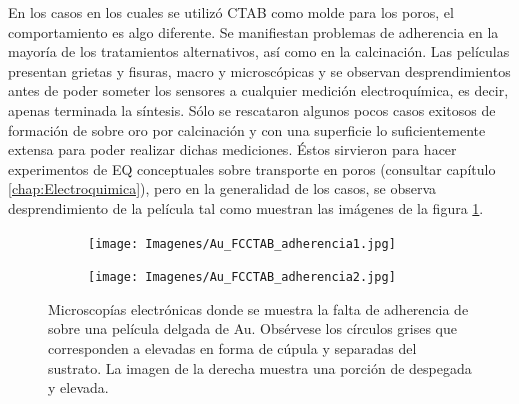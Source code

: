 			En los casos en los cuales se utilizó CTAB como molde para los poros, el comportamiento es algo diferente. Se manifiestan problemas de adherencia en la mayoría de los tratamientos alternativos, así como en la calcinación. Las películas presentan grietas y fisuras, macro y microscópicas y se observan desprendimientos antes de poder someter los sensores a cualquier medición electroquímica, es decir, apenas terminada la síntesis. Sólo se rescataron algunos pocos casos exitosos de formación de \pdmC\space sobre oro por calcinación y con una superficie lo suficientemente extensa para poder realizar dichas mediciones. Éstos sirvieron para hacer experimentos de EQ conceptuales sobre transporte en poros (consultar capítulo \ref{chap:Electroquimica}), pero en la generalidad de los casos, se observa desprendimiento de la película tal como muestran las imágenes de la figura \ref{fig:CTAB_adherencia}.

	     
				\begin{figure}[bh!]
		 	   	    \begin{subfigure}[t]{0.49\textwidth}
			        	\texttt{[image: Imagenes/Au\_FCCTAB\_adherencia1.jpg]}
			       		\end{subfigure}
					\begin{subfigure}[t]{0.49\textwidth}
			 	   	    \texttt{[image: Imagenes/Au\_FCCTAB\_adherencia2.jpg]}
			       		\end{subfigure}
					 \caption[Adherencia de CTAB sobre electrodos.]{Microscopías electrónicas donde se muestra la falta de adherencia de \pdmC\space sobre una película delgada de Au. Obsérvese los círculos grises que corresponden a \pdm\space elevadas en forma de cúpula y separadas del sustrato. La imagen de la derecha muestra una porción de \pdmC\space despegada y elevada.}
					 \label{fig:CTAB_adherencia}	
				     \end{figure}
			
